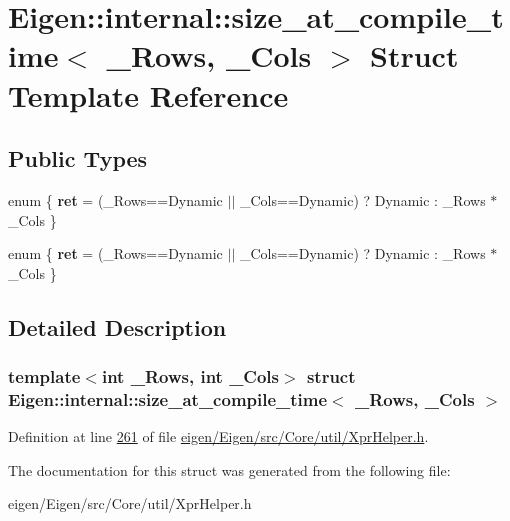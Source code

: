\hypertarget{struct_eigen_1_1internal_1_1size__at__compile__time}{}\section{Eigen\+:\+:internal\+:\+:size\+\_\+at\+\_\+compile\+\_\+time$<$ \+\_\+\+Rows, \+\_\+\+Cols $>$ Struct Template Reference}
\label{struct_eigen_1_1internal_1_1size__at__compile__time}
\subsection*{Public Types}
\begin{DoxyCompactItemize}
\item 
\mbox{\label{struct_eigen_1_1internal_1_1size__at__compile__time_aaf17e85d67435ff1699284b4f0e32e55}} 
enum \{ {\bfseries ret} = (\+\_\+\+Rows==Dynamic $\vert$$\vert$ \+\_\+\+Cols==Dynamic) ? Dynamic \+: \+\_\+\+Rows $\ast$ \+\_\+\+Cols
 \}
\item 
\mbox{\label{struct_eigen_1_1internal_1_1size__at__compile__time_a65cdd01f059980f351dea4bf389856d3}} 
enum \{ {\bfseries ret} = (\+\_\+\+Rows==Dynamic $\vert$$\vert$ \+\_\+\+Cols==Dynamic) ? Dynamic \+: \+\_\+\+Rows $\ast$ \+\_\+\+Cols
 \}
\end{DoxyCompactItemize}


\subsection{Detailed Description}
\subsubsection*{template$<$int \+\_\+\+Rows, int \+\_\+\+Cols$>$\newline
struct Eigen\+::internal\+::size\+\_\+at\+\_\+compile\+\_\+time$<$ \+\_\+\+Rows, \+\_\+\+Cols $>$}



Definition at line \hyperlink{eigen_2_eigen_2src_2_core_2util_2_xpr_helper_8h_source_l00261}{261} of file \hyperlink{eigen_2_eigen_2src_2_core_2util_2_xpr_helper_8h_source}{eigen/\+Eigen/src/\+Core/util/\+Xpr\+Helper.\+h}.



The documentation for this struct was generated from the following file\+:\begin{DoxyCompactItemize}
\item 
eigen/\+Eigen/src/\+Core/util/\+Xpr\+Helper.\+h\end{DoxyCompactItemize}
